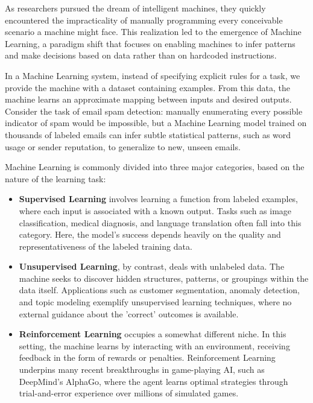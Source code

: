 \documentclass[openany]{book}
\begin{document}
As researchers pursued the dream of intelligent machines, they quickly 
encountered the impracticality of manually programming every conceivable 
scenario a machine might face. This realization led to the emergence of Machine 
Learning, a paradigm shift that focuses on enabling machines to infer patterns 
and make decisions based on data rather than on hardcoded instructions.

In a Machine Learning system, instead of specifying explicit rules for a task, 
we provide the machine with a dataset containing examples. From this data, the 
machine learns an approximate mapping between inputs and desired outputs. 
Consider the task of email spam detection: manually enumerating every possible 
indicator of spam would be impossible, but a Machine Learning model trained on 
thousands of labeled emails can infer subtle statistical patterns, such as word 
usage or sender reputation, to generalize to new, unseen emails.

Machine Learning is commonly divided into three major categories, based on the 
nature of the learning task:

\begin{itemize}
    \item \textbf{Supervised Learning} involves learning a function from labeled
    examples, where each input is associated with a known output. Tasks such as 
    image classification, medical diagnosis, and language translation often fall
    into this category. Here, the model's success depends heavily on the quality
    and representativeness of the labeled training data.
    
    \item \textbf{Unsupervised Learning}, by contrast, deals with unlabeled 
    data. The machine seeks to discover hidden structures, patterns, or 
    groupings within the data itself. Applications such as customer 
    segmentation, anomaly detection, and topic modeling exemplify unsupervised 
    learning techniques, where no external guidance about the 'correct' outcomes
    is available.
    
    \item \textbf{Reinforcement Learning} occupies a somewhat different niche. 
    In this setting, the machine learns by interacting with an environment, 
    receiving feedback in the form of rewards or penalties. Reinforcement 
    Learning underpins many recent breakthroughs in game-playing AI, such as 
    DeepMind's AlphaGo, where the agent learns optimal strategies through 
    trial-and-error experience over millions of simulated games.
\end{itemize}
\end{document}
